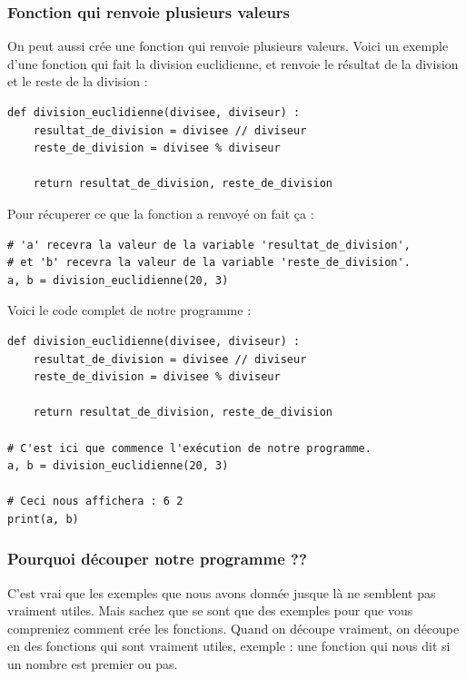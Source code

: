 \documentclass[12pt]{article}
\begin{document}
        \subsubsection{Fonction qui renvoie plusieurs valeurs}
            On peut aussi crée une fonction qui renvoie plusieurs valeurs. Voici un exemple d'une fonction qui fait
            la division euclidienne, et renvoie le résultat de la division et le reste de la division :
            \begin{lstlisting}[style=code]
def division_euclidienne(divisee, diviseur) :
    resultat_de_division = divisee // diviseur
    reste_de_division = divisee % diviseur

    return resultat_de_division, reste_de_division
            \end{lstlisting}

            Pour récuperer ce que la fonction a renvoyé on fait ça :
            \begin{lstlisting}[style=code]
# 'a' recevra la valeur de la variable 'resultat_de_division', 
# et 'b' recevra la valeur de la variable 'reste_de_division'.
a, b = division_euclidienne(20, 3)
            \end{lstlisting}

            Voici le code complet de notre programme :
            \begin{lstlisting}[style=code]
def division_euclidienne(divisee, diviseur) :
    resultat_de_division = divisee // diviseur
    reste_de_division = divisee % diviseur

    return resultat_de_division, reste_de_division

# C'est ici que commence l'exécution de notre programme.
a, b = division_euclidienne(20, 3)

# Ceci nous affichera : 6 2
print(a, b)
            \end{lstlisting}

        \subsubsection{Pourquoi découper notre programme ??}
        C'est vrai que les exemples que nous avons donnée jusque là ne semblent pas vraiment utiles. Mais sachez que
        se sont que des exemples pour que vous compreniez comment crée les fonctions. Quand on découpe vraiment, 
        on découpe en des fonctions qui sont vraiment utiles, exemple : une fonction qui nous dit si un nombre
        est premier ou pas.
\end{document}
